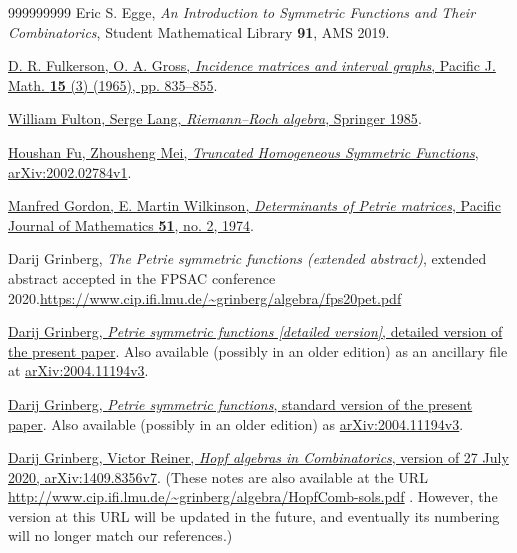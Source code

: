 \documentclass[numbers=enddot,12pt,final,onecolumn,notitlepage]{scrartcl}%
\theoremstyle{definition}
\newenvironment{verlong}{}{}
\newenvironment{vershort}{}{}
\begin{document}
\begin{thebibliography}{999999999}
Eric S. Egge, \textit{An Introduction to Symmetric
Functions and Their Combinatorics}, Student Mathematical Library \textbf{91},
AMS 2019.

%
\href{https://projecteuclid.org/journals/pacific-journal-of-mathematics/volume-15/issue-3/Incidence-matrices-and-interval-graphs/pjm/1102995572.full}{D.
R. Fulkerson, O. A. Gross, \textit{Incidence matrices and interval graphs},
Pacific J. Math. \textbf{15} (3) (1965), pp. 835--855}.

%
\href{https://doi.org/10.1007/978-1-4757-1858-4}{William Fulton, Serge Lang,
\textit{Riemann--Roch algebra}, Springer 1985}.

\href{https://arxiv.org/abs/2002.02784v1}{Houshan
Fu, Zhousheng Mei, \textit{Truncated Homogeneous Symmetric Functions},
arXiv:2002.02784v1}.

%
\href{https://projecteuclid.org/euclid.pjm/1102912464}{Manfred Gordon, E.
Martin Wilkinson, \textit{Determinants of Petrie matrices}, Pacific Journal of
Mathematics \textbf{51}, no. 2, 1974}.

Darij Grinberg, \textit{The Petrie symmetric
functions (extended abstract)}, extended abstract accepted in the FPSAC
conference 2020.\newline\url{https://www.cip.ifi.lmu.de/~grinberg/algebra/fps20pet.pdf}

\begin{vershort}


%
\href{http://www.cip.ifi.lmu.de/~grinberg/algebra/petriesym-long.pdf}{Darij
Grinberg, \textit{Petrie symmetric functions [detailed version]}, detailed
version of the present paper}. Also available (possibly in an older edition)
as an ancillary file at
\href{https://arxiv.org/abs/2004.11194v3}{arXiv:2004.11194v3}.
\end{vershort}

\begin{verlong}


%
\href{http://www.cip.ifi.lmu.de/~grinberg/algebra/petriesym.pdf}{Darij
Grinberg, \textit{Petrie symmetric functions}, standard version of the present
paper}. Also available (possibly in an older edition) as
\href{https://arxiv.org/abs/2004.11194v3}{arXiv:2004.11194v3}.
\end{verlong}

\href{https://arxiv.org/abs/1409.8356v7}{Darij
Grinberg, Victor Reiner, \textit{Hopf algebras in Combinatorics}, version of
27 July 2020, arXiv:1409.8356v7}. \newline(These notes are also available at
the URL \url{http://www.cip.ifi.lmu.de/~grinberg/algebra/HopfComb-sols.pdf} .
However, the version at this URL will be updated in the future, and eventually
its numbering will no longer match our references.)


\end{thebibliography}
\end{document}

